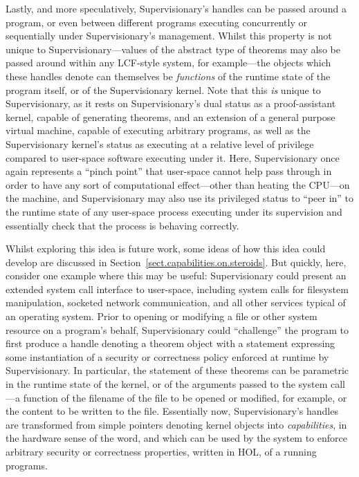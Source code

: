 \documentclass[a4paper, UKenglish, cleveref, autoref, thm-restate, colorlinks]{lipics-v2021}
\begin{document}
Lastly, and more speculatively, Supervisionary's handles can be passed around a program, or even between different programs executing concurrently or sequentially under Supervisionary's management.
Whilst this property is not unique to Supervisionary---values of the abstract type of theorems may also be passed around within any LCF-style system, for example---the objects which these handles denote can themselves be \emph{functions} of the runtime state of the program itself, or of the Supervisionary kernel.
Note that this \emph{is} unique to Supervisionary, as it rests on Supervisionary's dual status as a proof-assistant kernel, capable of generating theorems, and an extension of a general purpose virtual machine, capable of executing arbitrary programs, as well as the Supervisionary kernel's status as executing at a relative level of privilege compared to user-space software executing under it.
Here, Supervisionary once again represents a ``pinch point'' that user-space cannot help pass through in order to have any sort of computational effect---other than heating the CPU---on the machine, and Supervisionary may also use its privileged status to ``peer in'' to the runtime state of any user-space process executing under its supervision and essentially check that the process is behaving correctly.

Whilst exploring this idea is future work, some ideas of how this idea could develop are discussed in Section~\ref{sect.capabilities.on.steroids}.
But quickly, here, consider one example where this may be useful: Supervisionary could present an extended system call interface to user-space, including system calls for filesystem manipulation, socketed network communication, and all other services typical of an operating system.
Prior to opening or modifying a file or other system resource on a program's behalf, Supervisionary could ``challenge'' the program to first produce a handle denoting a theorem object with a statement expressing some instantiation of a security or correctness policy enforced at runtime by Supervisionary.
In particular, the statement of these theorems can be parametric in the runtime state of the kernel, or of the arguments passed to the system call---a function of the filename of the file to be opened or modified, for example, or the content to be written to the file.
Essentially now, Supervisionary's handles are transformed from simple pointers denoting kernel objects into \emph{capabilities}, in the hardware sense of the word, and which can be used by the system to enforce arbitrary security or correctness properties, written in HOL, of a running programs.
\end{document}
